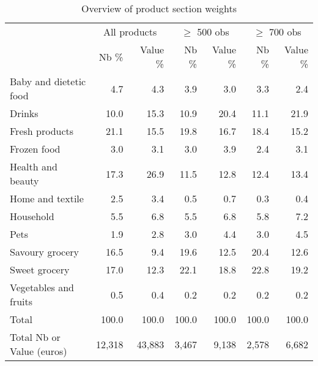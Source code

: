 \documentclass[english]{article}
\begin{document}
\begin{table}[H]
\renewcommand{\arraystretch}{0.7}%
\caption{Overview of product section weights}\label{tab:qlmc_sections}
\small
\begin{tabular}{lrr|rr|rr}
\toprule
\toprule
& \multicolumn{2}{c}{All products} & \multicolumn{2}{c|}{$\ge$ 500 obs} & \multicolumn{2}{c|}{$\ge$ 700 obs} \\
& Nb \% & Value \% & Nb \% & Value \% & Nb \% & Value \% \\
\midrule
    Baby and dietetic food & 4.7   & 4.3   & 3.9   & 3.0   & 3.3   & 2.4 \\
    Drinks & 10.0  & 15.3  & 10.9  & 20.4  & 11.1  & 21.9 \\
    Fresh products & 21.1  & 15.5  & 19.8  & 16.7  & 18.4  & 15.2 \\
    Frozen food & 3.0   & 3.1   & 3.0   & 3.9   & 2.4   & 3.1 \\
    Health and beauty & 17.3  & 26.9  & 11.5  & 12.8  & 12.4  & 13.4 \\
    Home and textile & 2.5   & 3.4   & 0.5   & 0.7   & 0.3   & 0.4 \\
    Household & 5.5   & 6.8   & 5.5   & 6.8   & 5.8   & 7.2 \\
    Pets  & 1.9   & 2.8   & 3.0   & 4.4   & 3.0   & 4.5 \\
    Savoury grocery & 16.5  & 9.4   & 19.6  & 12.5  & 20.4  & 12.6 \\
    Sweet grocery & 17.0  & 12.3  & 22.1  & 18.8  & 22.8  & 19.2 \\
    Vegetables and fruits & 0.5   & 0.4   & 0.2   & 0.2   & 0.2   & 0.2 \\
\midrule
    Total & 100.0 & 100.0 & 100.0 & 100.0 & 100.0 & 100.0 \\
    Total Nb or Value (euros) & 12,318 & 43,883 & 3,467 & 9,138 & 2,578 & 6,682 \\
\bottomrule
\bottomrule
\end{tabular}
\end{table}
\end{document}
